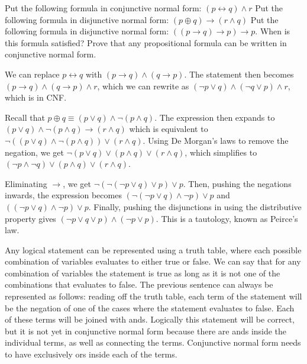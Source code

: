 \documentclass[solution, letterpaper]{cs20}
\begin{document}




\subproblem Put the following formula in conjunctive normal form: $(p \leftrightarrow q) \land r$
\subproblem Put the following formula in disjunctive normal form: $(p \oplus q) \rightarrow (r \land q)$
\subproblem Put the following formula in disjunctive normal form: $((p \rightarrow q) \rightarrow p) \rightarrow p$. When is this formula satisfied?
\subproblem Prove that any propositional formula can be written in conjunctive normal form. 

\begin{solution}
\subsolution  We can replace $p \leftrightarrow q$ with $(p \rightarrow q) \land (q \rightarrow p)$. The statement then becomes $(p \rightarrow q) \land (q \rightarrow p) \land r$, which we can rewrite as $(\lnot p \lor q) \land (\lnot q \lor p) \land r$, which is in CNF.

\subsolution Recall that $p \oplus q \equiv (p \lor q) \land \lnot (p \land q)$. The expression then expands to $(p \lor q) \land \lnot (p \land q) \rightarrow (r \land q)$ which is equivalent to $\lnot((p \lor q) \land \lnot (p \land q)) \lor (r \land q)$. Using De Morgan's laws to remove the negation, we get $\lnot (p \lor q) \lor (p \land q) \lor (r \land q)$, which simplifies to $(\lnot p \land \lnot q) \lor (p \land q) \lor (r \land q)$.

\subsolution Eliminating $\rightarrow$, we get $\lnot (\lnot (\lnot p \lor q) \lor p) \lor p$. Then, pushing the negations inwards, the expression becomes $(\lnot (\lnot p \lor q) \land \lnot p) \lor p$ and $((\lnot p \lor q) \land \lnot p) \lor p$. Finally, pushing the disjunctions in using the distributive property gives $(\lnot p \lor q \lor p) \land (\lnot p \lor p)$. This is a tautology, known as Peirce's law.

\subsolution Any logical statement can be represented using a truth table, where each possible combination of variables evaluates to either true or false. We can say that for any combination of variables the statement is true as long as it is not one of the combinations that evaluates to false. The previous sentence can always be represented as follows: reading off the truth table, each term of the  statement will be the negation of one of the cases where the statement evaluates to false. Each of these terms will be joined with ands. Logically this statement will be correct, but it is not yet in conjunctive normal form because there are ands inside the individual terms, as well as connecting the terms. Conjunctive normal form needs to have exclusively ors inside each of the terms. 


\end{solution}
\end{document}
